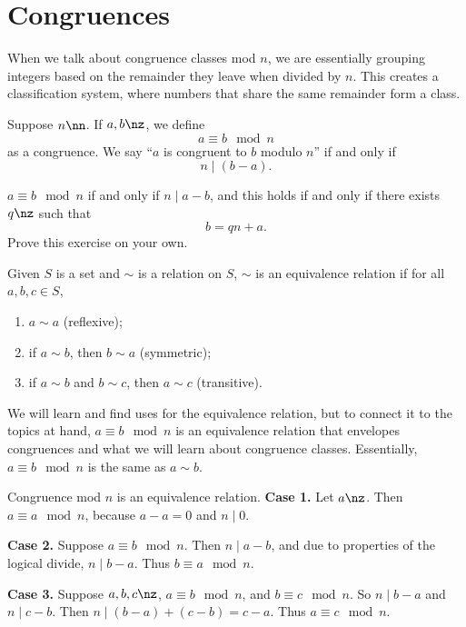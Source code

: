 
\section{Congruences}

When we talk about congruence classes mod $n$, we are essentially grouping integers based on the remainder they leave when divided by $n$.
This creates a classification system, where numbers that share the same remainder form a class.

\begin{definition}[Congruence]
    Suppose $n\nn$.
    If $a,b\nz$, we define
    \[
        a \equiv b \mod n
    \]
    as a congruence.
    We say ``$a$ is congruent to $b$ modulo $n$'' if and only if
    \[
        n \mid (b-a).
    \]
\end{definition}

\begin{lemma*}{
    $a\equiv b\mod n$ if and only if $n\mid a-b$, and this holds if and only if there exists $q\nz$ such that
    \[
        b = qn + a.
    \]
    Prove this exercise on your own.
}
\end{lemma*}

\begin{definition}
    Given $S$ is a set and $\sim$ is a relation on $S$, $\sim$ is an equivalence relation if for all $a,b,c\in S$,
    \begin{enumerate}
        \item $a\sim a$ (reflexive);
        \item if $a\sim b$, then $b\sim a$ (symmetric);
        \item if $a\sim b$ and $b\sim c$, then $a\sim c$ (transitive).
    \end{enumerate}
\end{definition}

We will learn and find uses for the equivalence relation, but to connect it to the topics at hand, $a\equiv b\mod n$ is an equivalence relation that envelopes congruences and what we will learn about congruence classes.
Essentially, $a\equiv b\mod n$ is the same as $a\sim b$.

\begin{lemma}{
    Congruence mod $n$ is an equivalence relation.
}
    \textbf{Case 1.}
    Let $a\nz$.
    Then $a\equiv a\mod n$, because $a-a = 0$ and $n\mid 0$.

    \textbf{Case 2.}
    Suppose $a\equiv b\mod n$.
    Then $n\mid a-b$, and due to properties of the logical divide, $n\mid b-a$.
    Thus $b\equiv a\mod n$.

    \textbf{Case 3.}
    Suppose $a,b,c\nz$, $a\equiv b\mod n$, and $b\equiv c\mod n$.
    So $n\mid b-a$ and $n\mid c-b$.
    Then $n\mid (b-a)+(c-b) = c-a$.
    Thus $a\equiv c\mod n$.
\end{lemma}

